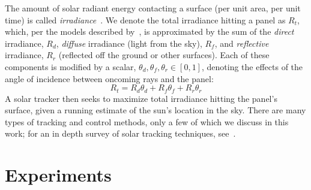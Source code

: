 \documentclass[11pt]{article}
\begin{document}
The amount of solar radiant energy contacting a surface (per unit area, per unit time) is called {\it irradiance}~\cite{goswami2000principles}.  We denote the total irradiance hitting a panel as $R_t$, which, per the models described by~\citet{kamali2006estimating}, is approximated by the sum of the {\it direct} irradiance, $R_d$, {\it diffuse} irradiance (light from the sky), $R_f$, and {\it reflective} irradiance, $R_r$ (reflected off the ground or other surfaces). Each of these components is modified by a scalar, $\theta_d, \theta_f, \theta_r \in [0,1]$, denoting the effects of the angle of incidence between oncoming rays and the panel:
\begin{equation}
R_t = R_d \theta_d + R_f \theta_f + R_r \theta_r
\label{eq:total_rads}
\end{equation}
A solar tracker then seeks to maximize total irradiance hitting the panel's surface, given a running estimate of the sun's location in the sky. There are many types of tracking and control methods, only a few of which we discuss in this work; for an in depth survey of solar tracking techniques, see~\citet{mousazadeh2009review}.



\section{Experiments}
\end{document}

